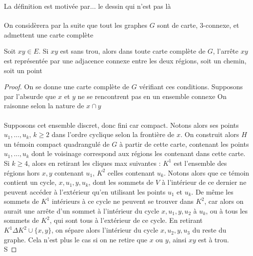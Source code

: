 \documentclass{scrartcl}
\begin{document}
\begin{flushleft}
La définition est motivée par... le dessin qui n'est pas là
\\~\\
On considèrera par la suite que tout les graphes $G$ sont de carte, $3$-connexe, et admettent une carte complète

\begin{lem}\label{contrSanstrou}
    Soit $xy \in E$. Si $xy$ est sans trou, alors dans toute carte complète de $G$, l'arrête $xy$ est représentée par une adjacence
    connexe entre les deux régions, soit un chemin, soit un point
\end{lem}

\begin{proof}
    On se donne une carte complète de $G$ vérifiant ces conditions. Supposons par l'absurde que $x$ et $y$ ne se rencontrent pas en un ensemble connexe
    On raisonne selon la nature de $x \cap y$
    \\~\\
    Supposons cet ensemble discret, donc fini car compact. Notons alors ses points
    $u_1, ..., u_k$, $k \geq 2$ dans l'ordre cyclique selon la frontière de $x$. On construit alors $H$ un témoin compact quadrangulé de $G$
    à partir de cette carte, contenant les points $u_1, ..., u_k$ dont le voisinage correspond aux régions les contenant dans cette carte.\\
    Si $k \geq 4$, alors en retirant les cliques max suivantes : $K^1$ est l'ensemble des régions hors $x, y$ contenant $u_1$,
    $K^2$ celles contenant $u_k$. Notons alors que ce témoin contient un cycle, $x, u_1, y, u_k$, dont les sommets de $V$ à l'intérieur
    de ce dernier ne peuvent accéder à l'extérieur qu'en utilisant les points $u_1$ et $u_k$. De même les sommets de $K^1$ intérieurs
    à ce cycle ne peuvent se trouver dans $K^2$, car alors on aurait une arrête d'un sommet à l'intérieur du cycle $x, u_1, y, u_2$
    à $u_k$, ou à tous les sommets de $K^2$, qui sont tous à l'extérieur de ce cycle. En retirant $K^1 \Delta K^2 \cup \{x,y\}$, on sépare
    alors l'intérieur du cycle $x, u_2, y, u_3$ du reste du graphe. Cela n'est plus le cas si on ne retire que $x$ ou $y$, ainsi $xy$
    est à trou.\\
    S


\end{proof}
\end{flushleft}
\end{document}
